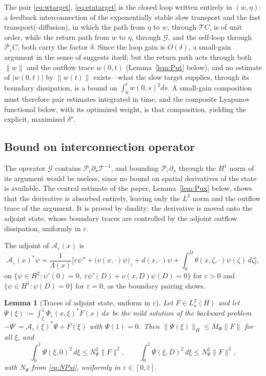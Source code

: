 \documentclass[12pt]{article}
\theoremstyle{plain}
\newtheorem{lemma}{Lemma}
\theoremstyle{remark}
\newcommand{\PP}{\mathcal P}
\newcommand{\TT}{\mathcal T}
\newcommand{\Hs}{H}
\begin{document}
The pair \eqref{eq:wtarget}, \eqref{eq:etatarget} is the closed loop written entirely in $(w,\eta)$: a feedback interconnection of the exponentially stable slow transport and the fast transport(-diffusion), in which the path from $\eta$ to $w$, through $\TT C$, is of unit order, while the return path from $w$ to $\eta$, through $\mathcal G$, and the self-loop through $\PP_\varepsilon C$, both carry the factor $\delta$. Since the loop gain is $O(\delta)$, a small-gain argument in the sense of \cite{KarafyllisKrstic2019} suggests itself; but the return path acts through both $\|w\|$ and the outflow trace $w(0,t)$ (Lemma~\ref{lem:Put} below), and no estimate of $|w(0,t)|$ by $\|w(t)\|$ exists---what the slow target supplies, through its boundary dissipation, is a bound on $\int_0^tw(0,s)^2ds$. A small-gain composition must therefore pair estimates integrated in time, and the composite Lyapunov functional below, with its optimized weight, is that composition, yielding the explicit, maximized $\delta^\star$.

\subsection{Bound on interconnection operator}
The operator $\mathcal G$ contains $\PP_\varepsilon\partial_x\TT^{-1}$, and bounding $\PP_\varepsilon\partial_x$ through the $H^1$ norm of its argument would be useless, since no bound on spatial derivatives of the state is available. The central estimate of the paper, Lemma~\ref{lem:Pux} below, shows that the derivative is absorbed entirely, leaving only the $L^2$ norm and the outflow trace of the argument. It is proved by duality: the derivative is moved onto the adjoint state, whose boundary traces are controlled by the adjoint outflow dissipation, uniformly in $\varepsilon$.

The adjoint of $\mathcal A_\varepsilon(x)$ is
\begin{equation}
 \mathcal A_\varepsilon(x)^*\psi
 =\frac{1}{\Lambda(x)}
 \Big[\varepsilon\psi''+\big(\nu(x,\cdot)\psi\big)_z+d(x,\cdot)\psi
 +\int_0^D\theta(x,\zeta,\cdot)\psi(\zeta)\,d\zeta\Big],
 \label{eq:Aepsstar}
\end{equation}
on $\{\psi\in H^2:\psi'(0)=0,\ \varepsilon\psi'(D)+\nu(x,D)\psi(D)=0\}$ for $\varepsilon>0$ and $\{\psi\in H^1:\psi(D)=0\}$ for $\varepsilon=0$, as the boundary pairing shows.

\begin{lemma}[Traces of adjoint state, uniform in $\varepsilon$]\label{lem:adjtrace}
Let $F\in L^2_x(\Hs)$ and let $\Psi(\xi):=\int_\xi^1\Phi_\varepsilon(x,\xi)^*F(x)\,dx$ be the mild solution of the backward problem $-\Psi'=\mathcal A_\varepsilon(\xi)^*\Psi+F(\xi)$ with $\Psi(1)=0$. Then $\|\Psi(\xi)\|_\Hs\le M_\Phi\|F\|$ for all $\xi$, and
\begin{equation}
 \int_0^1\Psi(\xi,0)^2\,d\xi\le N_\Psi^2\|F\|^2,
 \qquad
 \int_0^1\Psi(\xi,D)^2\,d\xi\le N_\Psi^2\|F\|^2,
 \label{eq:adjtrace}
\end{equation}
with $N_\Psi$ from \eqref{eq:NPsi}, uniformly in $\varepsilon\in[0,\bar\varepsilon]$.
\end{lemma}
\end{document}
